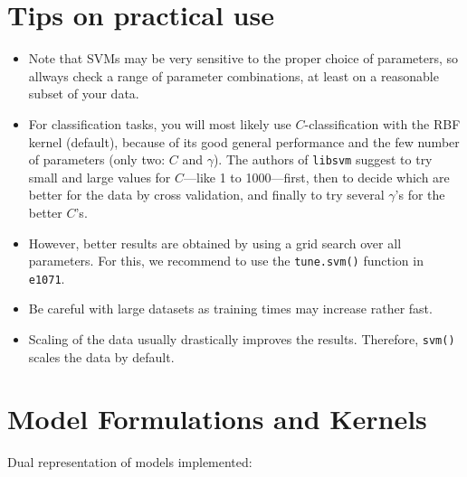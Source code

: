 \documentclass[a4paper]{article}
\newcommand{\pkg}[1]{\texttt{#1}}
\begin{document}
\section*{Tips on practical use}
\begin{itemize}
 \item Note that SVMs may be very
  sensitive to the proper choice of parameters, so allways check a range
  of parameter combinations, at least on a reasonable subset of your
  data.
 \item For classification tasks, you will most likely use
  $C$-classification with the RBF kernel (default), because of its good
  general performance and the few number of parameters 
  (only two: $C$ and $\gamma$). The authors of \pkg{libsvm} suggest
  to try small and large values for $C$---like 1 to 1000---first,
  then to decide which are
  better for the data by cross validation, and finally to try
  several $\gamma$'s for the better $C$'s.
 \item However, better results are obtained by using a grid search
 over all parameters. For this, we recommend to use the
 \texttt{tune.svm()} function in \pkg{e1071}.
 \item Be careful with large datasets as training times may increase
  rather fast.
 \item Scaling of the data usually drastically improves the
 results. Therefore, \texttt{svm()} scales the data by default.
\end{itemize}

\section*{Model Formulations and Kernels}

Dual representation of models implemented:
\end{document}
